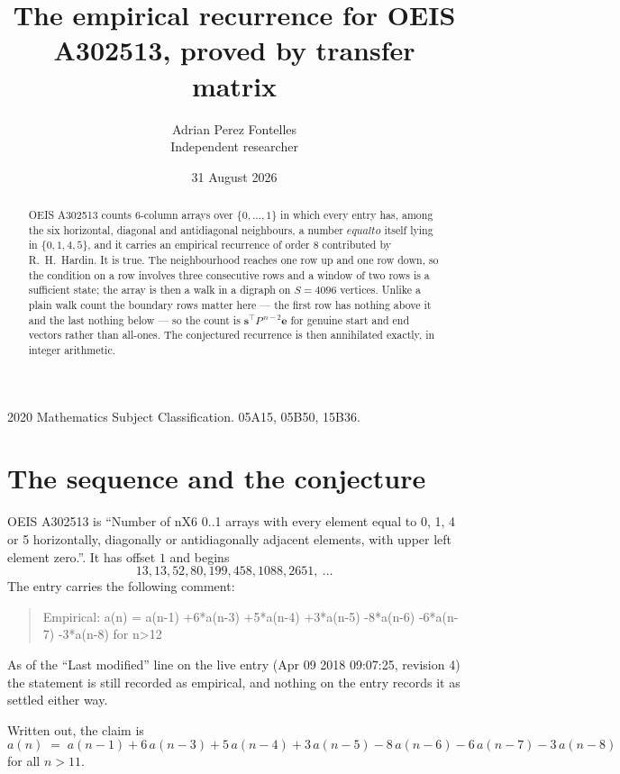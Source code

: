 \documentclass[11pt,a4paper]{article}
\title{The empirical recurrence for OEIS A302513, proved by transfer matrix}
\author{Adrian Perez Fontelles\\ \small Independent researcher}
\date{31 August 2026}
\theoremstyle{plain}
\theoremstyle{definition}
\begin{document}
\maketitle

\begin{abstract}
OEIS A302513 counts $6$-column arrays over $\{0,\dots,1\}$ in which every entry has,
among the six horizontal, diagonal and antidiagonal neighbours, a number $equal to$ itself lying in $\{0,1,4,5\}$, and it carries an empirical
recurrence of order $8$ contributed by R.~H.~Hardin. It is true. The neighbourhood
reaches one row up and one row down, so the condition on a row involves three consecutive
rows and a window of two rows is a sufficient state; the array is then a walk in a digraph
on $S=4096$ vertices. Unlike a plain walk count the boundary rows matter here --- the first
row has nothing above it and the last nothing below --- so the count is
$\mathbf{s}^{\!\top}P^{\,n-2}\mathbf{e}$ for genuine start and end vectors rather than
all-ones. The conjectured recurrence is then annihilated exactly, in integer arithmetic.
\end{abstract}

\noindent\small 2020 Mathematics Subject Classification. 05A15, 05B50, 15B36.\normalsize

\section{The sequence and the conjecture}

OEIS A302513 is ``Number of nX6 0..1 arrays with every element equal to 0, 1, 4 or 5 horizontally, diagonally or antidiagonally adjacent elements, with upper left element zero.''. It has offset
$1$ and begins
\[
13, 13, 52, 80, 199, 458, 1088, 2651,\ \dots
\]
The entry carries the following comment:
\begin{quote}\small
Empirical: a(n) = a(n-1) +6*a(n-3) +5*a(n-4) +3*a(n-5) -8*a(n-6) -6*a(n-7) -3*a(n-8) for n>12
\end{quote}
As of the ``Last modified'' line on the live entry (Apr 09 2018 09:07:25, revision
4) the statement is still recorded as empirical, and nothing on the entry
records it as settled either way.

Written out, the claim is
\begin{equation}\label{eq:conj}
a(n)\;=\;a(n-1) + 6\,a(n-3) + 5\,a(n-4) + 3\,a(n-5) - 8\,a(n-6) - 6\,a(n-7) - 3\,a(n-8)
\end{equation}
for all $n>11$.
\end{document}
